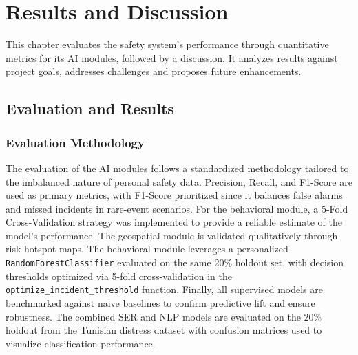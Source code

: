 \documentclass[12pt,a4paper,oneside,english]{book}
\begin{document}
{\chapter{Results and Discussion}
\label{ch:results_and_disc}

This chapter evaluates the safety system's performance through quantitative metrics for its AI modules, followed by a discussion. 
It analyzes results against project goals, addresses challenges and proposes future enhancements.
\section{Evaluation and Results}
\label{sec:results}

    \subsection{Evaluation Methodology}
    \label{subsec:eval_methodology}


The evaluation of the AI modules follows a standardized methodology tailored to the imbalanced nature of personal safety data. 
Precision, Recall, and F1-Score are used as primary metrics, with F1-Score prioritized since it balances false alarms and missed incidents in rare-event scenarios. 
For the behavioral module, a 5-Fold Cross-Validation strategy was implemented to provide a reliable estimate of the model's performance.
The geospatial module is validated qualitatively through risk hotspot maps. %
The behavioral module leverages a personalized \texttt{RandomForestClassifier} evaluated on the same 20\% holdout set, with decision thresholds optimized via 5-fold cross-validation in the \texttt{optimize\_incident\_threshold} function. Finally, all supervised models are benchmarked against naive baselines to confirm predictive lift and ensure robustness.
The combined SER and NLP models are evaluated on the 20\% holdout from the Tunisian distress dataset with confusion matrices used to visualize classification performance.


}
\end{document}
